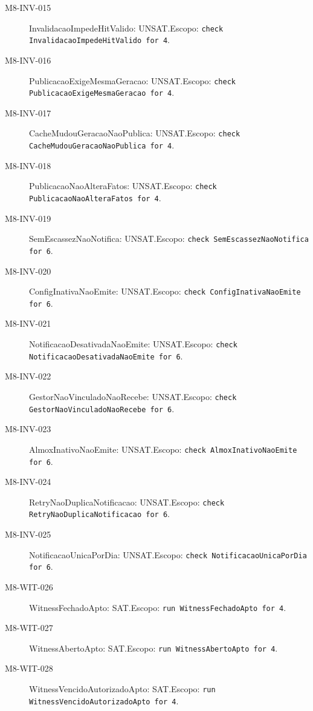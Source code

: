 \begin{description}
\item[M8-INV-015] InvalidacaoImpedeHitValido: UNSAT.\newline Escopo: \texttt{check InvalidacaoImpedeHitValido for 4}.
\item[M8-INV-016] PublicacaoExigeMesmaGeracao: UNSAT.\newline Escopo: \texttt{check PublicacaoExigeMesmaGeracao for 4}.
\item[M8-INV-017] CacheMudouGeracaoNaoPublica: UNSAT.\newline Escopo: \texttt{check CacheMudouGeracaoNaoPublica for 4}.
\item[M8-INV-018] PublicacaoNaoAlteraFatos: UNSAT.\newline Escopo: \texttt{check PublicacaoNaoAlteraFatos for 4}.
\item[M8-INV-019] SemEscassezNaoNotifica: UNSAT.\newline Escopo: \texttt{check SemEscassezNaoNotifica for 6}.
\item[M8-INV-020] ConfigInativaNaoEmite: UNSAT.\newline Escopo: \texttt{check ConfigInativaNaoEmite for 6}.
\item[M8-INV-021] NotificacaoDesativadaNaoEmite: UNSAT.\newline Escopo: \texttt{check NotificacaoDesativadaNaoEmite for 6}.
\item[M8-INV-022] GestorNaoVinculadoNaoRecebe: UNSAT.\newline Escopo: \texttt{check GestorNaoVinculadoNaoRecebe for 6}.
\item[M8-INV-023] AlmoxInativoNaoEmite: UNSAT.\newline Escopo: \texttt{check AlmoxInativoNaoEmite for 6}.
\item[M8-INV-024] RetryNaoDuplicaNotificacao: UNSAT.\newline Escopo: \texttt{check RetryNaoDuplicaNotificacao for 6}.
\item[M8-INV-025] NotificacaoUnicaPorDia: UNSAT.\newline Escopo: \texttt{check NotificacaoUnicaPorDia for 6}.
\item[M8-WIT-026] WitnessFechadoApto: SAT.\newline Escopo: \texttt{run WitnessFechadoApto for 4}.
\item[M8-WIT-027] WitnessAbertoApto: SAT.\newline Escopo: \texttt{run WitnessAbertoApto for 4}.
\item[M8-WIT-028] WitnessVencidoAutorizadoApto: SAT.\newline Escopo: \texttt{run WitnessVencidoAutorizadoApto for 4}.

\end{description}
